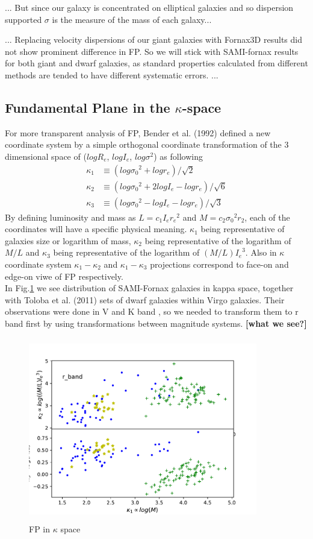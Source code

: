 \documentclass{aa}
\begin{document}
... But since our galaxy is concentrated on elliptical galaxies and so dispersion supported $\sigma$ is the measure of the mass of each galaxy...

... Replacing velocity dispersions of our giant galaxies with Fornax3D results did not show prominent difference in FP. So we will stick with SAMI-fornax results for both giant and dwarf galaxies, as standard properties calculated from different methods are tended to have different systematic errors. ... 

\subsection{Fundamental Plane in the $\kappa$-space}
For more transparent analysis of FP, Bender et al. (1992) defined a new coordinate system by a simple orthogonal coordinate transformation of the 3 dimensional space of ($logR_e$, $logI_e$, $log\sigma^2$) as following
\begin{align}
\kappa_1 &\equiv(log{\sigma_0}^2+log r_e)/\sqrt{2} \\
\kappa_2 &\equiv(log{\sigma_0}^2+2logI_e-log r_e)/\sqrt{6} \\
\kappa_3 &\equiv(log{\sigma_0}^2-log I_e-log r_e)/\sqrt{3}
\end{align}
By defining luminosity and mass as $L=c_1I_e{r_e}^2$ and $M=c_2{\sigma_0}^2r_2$, each of the coordinates will have a specific physical meaning. $\kappa_1$ being representative of galaxies size or logarithm of mass, $\kappa_2$ being representative of the logarithm of $M/L$ and $\kappa_3$ being representative of the logarithm of $(M/L){I_e}^3$. Also in $\kappa$ coordinate system $\kappa_1-\kappa_2$ and $\kappa_1-\kappa_3$ projections correspond to face-on and edge-on viwe of FP respectively.\\
In Fig.\ref{fig:FPkappa} we see distribution of SAMI-Fornax galaxies in kappa space, together with Toloba et al. (2011) sets of dwarf galaxies within Virgo galaxies. Their observations were done in V and K band , so we needed to transform them to r band first by using transformations between magnitude systems. \textbf{[what we see?]}
\begin{figure}[!htb]
   \centering
   \includegraphics[width=10cm,height=8cm,keepaspectrati]
   {../2_pipeline/3_FP_kappa+Liter/FP_kappa+Liter_EXC.pdf}
         \caption{FP in $\kappa$ space}
         \label{fig:FPkappa}
\end{figure}
\end{document}
